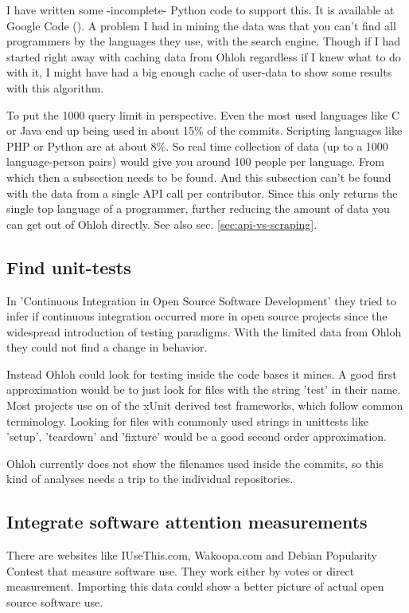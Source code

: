 \documentclass{sig-alternate}
\begin{document}
I have written some -incomplete- Python code to support this. It is available at Google Code (\cite{pyanohloh}). A problem I had in mining the data was that you can't find all programmers by the languages they use, with the search engine. Though if I had started right away with caching data from Ohloh regardless if I knew what to do with it, I might have had a big enough cache of user-data to show some results with this algorithm.

To put the 1000 query limit in perspective. Even the most used languages like C or Java end up being used in about 15\% of the commits. Scripting languages like PHP or Python are at about 8\%. So real time collection of data (up to a 1000 language-person pairs) would give you around 100 people per language. From which then a subsection needs to be found. And this subsection can't be found with the data from a single API call per contributor. Since this only returns the single top language of a programmer, further reducing the amount of data you can get out of Ohloh directly. See also sec. \ref{sec:api-vs-scraping}.


\subsection{Find unit-tests}\label{find-unittest}
In 'Continuous Integration in Open Source Software Development' \cite{Deshpande:2008p4463} they tried to infer if continuous integration occurred more in open source projects since the widespread introduction of testing para\-digms. With the limited data from Ohloh they could not find a change in behavior.

Instead Ohloh could look for testing inside the code bases it mines. A good first approximation would be to just look for files with the string 'test' in their name. Most projects use on of the xUnit derived test frameworks, which follow common terminology. Looking for files with commonly used strings in unittests like 'setup', 'teardown' and 'fixture' would be a good second order approximation.

Ohloh currently does not show the filenames used inside the commits, so this kind of analyses needs a trip to the individual repositories.


\subsection{Integrate software attention measurements}\label{sec:attention}
There are websites like IUseThis.com, Wakoopa.com and Debian Popularity Contest that measure software use. They work either by votes or direct measurement. Importing this data could show a better picture of actual open source software use.
\end{document}
